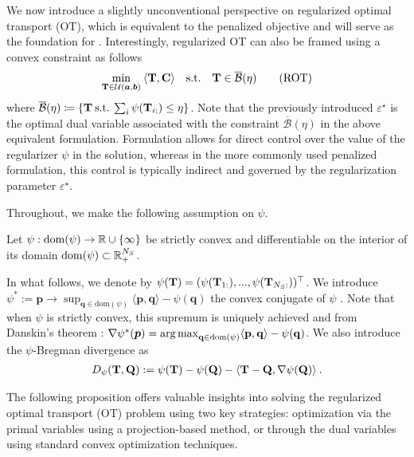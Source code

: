 We now introduce a slightly unconventional perspective on regularized optimal transport (OT), which is equivalent to the penalized objective and will serve as the foundation for .
Interestingly, regularized OT can also be framed using a convex constraint as follows
\begin{align}\label{eq:cot}
    \min_{{\mathbf{T}} \in {\mathcal{U}}(\bm{a}, \bm{b})} \: \langle {\mathbf{T}}, {\mathbf{C}} \rangle \quad \text{s.t.} \quad  {\mathbf{T}} \in \overline{\mathcal{B}}(\eta)
    \tag{ROT}
\end{align}
where $\overline{\mathcal{B}}(\eta) \coloneqq \{ {\mathbf{T}} \: \text{s.t.} \: \sum_i \psi({\mathbf{T}}_{i:}) \leq \eta \}$. Note that the previously introduced $\varepsilon^\star$ is the optimal dual variable associated with the constraint $\overline{\mathcal{B}}(\eta)$ in the above equivalent formulation. Formulation  allows for direct control over the value of the regularizer \( \psi \) in the solution, whereas in the more commonly used penalized formulation, this control is typically indirect and governed by the regularization parameter \( \varepsilon^\star \).

Throughout, we make the following assumption on $\psi$.
\begin{assumption}\label{assumption_psi}
    Let $\psi: \mathrm{dom}(\psi) \to \mathbb{R} \cup \{\infty\}$ be strictly convex and differentiable on the interior of its domain $\mathrm{dom}(\psi) \subset \mathbb{R}^{N_S}_+$.
\end{assumption}

In what follows, we denote by $\psi({\mathbf{T}}) = (\psi({\mathbf{T}}_{1:}), ..., \psi({\mathbf{T}}_{N_S:}))^\top$.
We introduce $\psi^*:= \mathbf{p} \to \sup_{\mathbf{q} \in \mathrm{dom}(\psi)} \langle \mathbf{p}, \mathbf{q} \rangle - \psi(\mathbf{q})$ the convex conjugate of $\psi$ \citep{rockafellar1997convex}.
Note that when $\psi$ is strictly convex, this supremum is uniquely achieved and from Danskin's theorem \citep{danskin1966theory}: $\nabla \psi^*(\bm{p}) = \operatorname*{arg\,max}_{\mathbf{q} \in \mathrm{dom}(\psi)} \langle \mathbf{p}, \mathbf{q} \rangle - \psi(\mathbf{q})$. We also introduce the $\psi$-Bregman divergence as 
\begin{align}
    D_\psi({\mathbf{T}}, {\mathbf{Q}}) := \psi({\mathbf{T}}) - \psi({\mathbf{Q}}) - \langle {\mathbf{T}} - {\mathbf{Q}}, \nabla \psi({\mathbf{Q}}) \rangle \:.
\end{align} 

The following proposition offers valuable insights into solving the regularized optimal transport (OT) problem using two key strategies: optimization via the primal variables using a projection-based method, or through the dual variables using standard convex optimization techniques.


